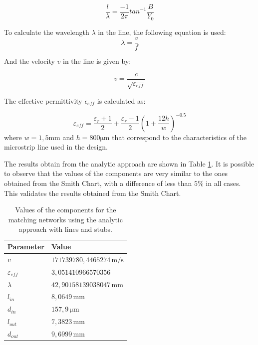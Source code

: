 \begin{equation}
    \frac{l}{\lambda} = \frac{-1}{2\pi}tan^{-1}\frac{B}{Y_0}
    \label{eq:llength}
\end{equation}

To calculate the wavelength $\lambda$ in the line, the following equation is used:
\begin{equation}
    \lambda = \frac{v}{f}
\end{equation}

And the velocity $v$ in the line is given by:

\begin{equation}
    v = \frac{c}{\sqrt{\varepsilon_{eff}}}
\end{equation}

The effective permittivity $\epsilon_{eff}$ is calculated as:

\begin{equation}
    \varepsilon_{eff} = \frac{\varepsilon_r + 1}{2} + \frac{\varepsilon_r - 1}{2}\left(1+\frac{12h}{w}\right)^{-0.5}
\end{equation}
where $w = 1,5 \si{\milli \meter}$ and $h = 800 \si{\micro \meter}$ that correspond to the characteristics of the microstrip line used in the design.


The results obtain from the analytic approach are shown in Table \ref{tab:MatchingValuesLines}. It is possible to observe that the values of the components are very similar to the ones obtained from the Smith Chart, with a difference of less than $5\%$ in all cases. This validates the results obtained from the Smith Chart.

\begin{table}[H]
    \centering
    \caption{Values of the components for the matching networks using the analytic approach with lines and stubs.}
    \begin{tabularx}{\textwidth}{>{\centering\arraybackslash}X >{\centering\arraybackslash}X}
        \toprule
        \textbf{Parameter} & \textbf{Value} \\
        \midrule
        $v$     & $171739780,4465274\,\si{\meter \per \second}$ \\
        \midrule
        $\varepsilon_{eff}$     & $3,051410966570356$ \\
        \midrule
        $\lambda$     & $42,90158139038047\,\si{\milli\meter}$ \\
        \midrule
        $l_{in}$     & $8,0649\,\si{\milli\meter}$ \\
        \midrule
        $d_{in}$   & $157,9\,\si{\micro\meter}$ \\
        \midrule
        $l_{out}$     & $7,3823\,\si{\milli\meter}$\\
        \midrule
        $d_{out}$   & $9,6999\,\si{\milli\meter}$\\
        \bottomrule
    \end{tabularx}
    \label{tab:MatchingValuesLines}
\end{table}

